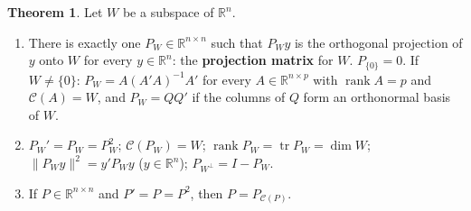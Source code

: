 \documentclass[12pt]{article}
\newcommand{\R}{\mathbb R}
\DeclareMathOperator{\tr}{tr}
\DeclareMathOperator{\rank}{rank}
\theoremstyle{definition}
\newtheorem{theorem}{Theorem}
\begin{document}
\begin{theorem}\label{h-thm-projection-matrix}
Let \(W\) be a subspace of \(\R^n\).
\begin{enumerate}
\item There is exactly one \(P_W\in\R^{n\times n}\) such that \(P_Wy\) is the orthogonal projection of \(y\) onto \(W\)
for every \(y\in\R^n\): the \textbf{projection matrix} for \(W\). \(P_{\{0\}}=0\). If \(W\ne\{0\}\):
\(P_W=A(A'A)^{-1}A'\) for every \(A\in\R^{n\times p}\) with \(\rank A=p\) and \(\mathcal C(A)=W\), and \(P_W=QQ'\) if
the columns of \(Q\) form an orthonormal basis of \(W\).
\item \(P_W'=P_W=P_W^2\); \(\mathcal C(P_W)=W\); \(\rank P_W=\tr P_W=\dim W\); \(\lVert P_Wy\rVert^2=y'P_Wy\)
(\(y\in\R^n\)); \(P_{W^\perp}=I-P_W\).
\item If \(P\in\R^{n\times n}\) and \(P'=P=P^2\), then \(P=P_{\mathcal C(P)}\).
\end{enumerate}
\end{theorem}
\end{document}

